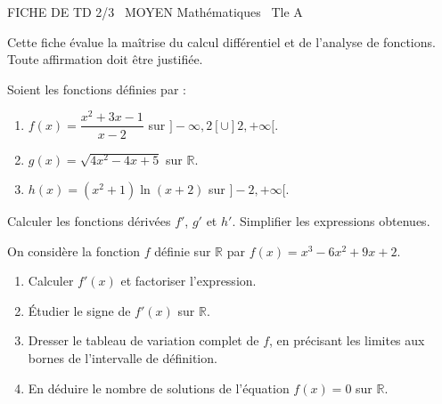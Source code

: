 \documentclass[11pt]{article}
\begin{document}
\begin{tcolorbox}[enhanced,colback=popink,colframe=popink,arc=10pt,boxrule=0pt,left=12pt,right=12pt,top=9pt,bottom=9pt]
{\color{white}\popxbold\small FICHE DE TD 2/3 \textbullet\ MOYEN \hfill Mathématiques \textbullet\ Tle A\par}
\end{tcolorbox}
\vspace{4pt}
Cette fiche évalue la maîtrise du calcul différentiel et de l'analyse de fonctions. Toute affirmation doit être justifiée.

\begin{exercice}
Soient les fonctions définies par :
\begin{enumerate}
    \item $f(x) = \dfrac{x^2 + 3x - 1}{x - 2}$ sur $]-\infty, 2[ \cup ]2, +\infty[$.
    \item $g(x) = \sqrt{4x^2 - 4x + 5}$ sur $\mathbb{R}$.
    \item $h(x) = (x^2 + 1)\ln(x + 2)$ sur $]-2, +\infty[$.
\end{enumerate}
Calculer les fonctions dérivées $f'$, $g'$ et $h'$. Simplifier les expressions obtenues.
\end{exercice}

\begin{exercice}
On considère la fonction $f$ définie sur $\mathbb{R}$ par $f(x) = x^3 - 6x^2 + 9x + 2$.
\begin{enumerate}
    \item Calculer $f'(x)$ et factoriser l'expression.
    \item Étudier le signe de $f'(x)$ sur $\mathbb{R}$.
    \item Dresser le tableau de variation complet de $f$, en précisant les limites aux bornes de l'intervalle de définition.
    \item En déduire le nombre de solutions de l'équation $f(x) = 0$ sur $\mathbb{R}$.
\end{enumerate}
\end{exercice}
\end{document}
